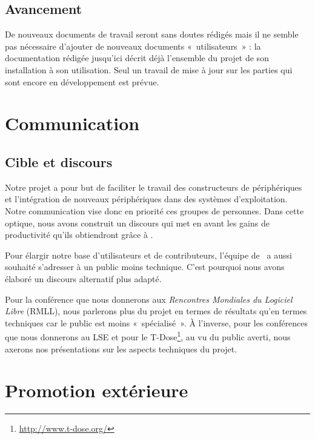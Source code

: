 \documentclass[francais]{rtxreport}
\begin{document}
\section{Avancement}

De nouveaux documents de travail seront sans doutes rédigés mais il ne semble
pas nécessaire d'ajouter de nouveaux documents «~utilisateurs~» : la
documentation rédigée jusqu'ici décrit déjà l'ensemble du projet de son
installation à son utilisation. Seul un travail de mise à jour sur les parties
qui sont encore en développement est prévue.

\chapter{Communication}




\section{Cible et discours}


Notre projet a pour but de faciliter le travail des constructeurs de
périphériques et l'intégration de nouveaux périphériques dans des systèmes
d'exploitation. Notre communication vise donc en priorité ces groupes de
personnes. Dans cette optique, nous avons construit un discours qui met en avant
les gains de productivité qu'ils obtiendront grâce à \rtx.

Pour élargir notre base d'utilisateurs et de contributeurs, l'équipe de \rtx\ a
aussi souhaité s'adresser à un public moins technique. C'est pourquoi nous
avons élaboré un discours alternatif plus adapté.

Pour la conférence que nous donnerons aux \emph{Rencontres Mondiales du Logiciel
 Libre} (RMLL), nous parlerons plus du projet en termes de résultats qu'en
termes techniques car le public est moins «~spécialisé~». \`{A} l'inverse, pour
les conférences que nous donnerons au LSE et pour le
T-Dose\footnote{\url{http://www.t-dose.org/}}, au vu du public averti, nous
axerons nos présentations sur les aspects techniques du projet.


\chapter{Promotion extérieure}
\end{document}
